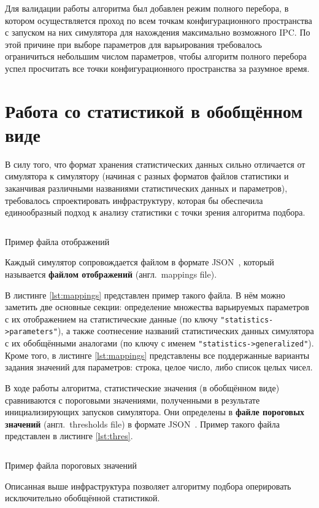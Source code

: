 Для валидации работы алгоритма был добавлен режим полного перебора, в котором осуществляется проход по всем точкам конфигурационного пространства с запуском на них симулятора для нахождения максимально возможного IPC. По этой причине при выборе параметров для варьирования требовалось ограничиться небольшим числом параметров, чтобы алгоритм полного перебора успел просчитать все точки конфигурационного пространства за разумное время.

\section{Работа со статистикой в обобщённом виде}

В силу того, что формат хранения статистических данных сильно отличается от симулятора к симулятору (начиная с разных форматов файлов статистики и заканчивая различными названиями статистических данных и параметров), требовалось спроектировать инфраструктуру, которая бы обеспечила единообразный подход к анализу статистики с точки зрения алгоритма подбора.

\begin{listing}[!htbp]
  \centering
  \inputminted{js}{listings/mappings.json}
  \caption{Пример файла отображений}
  \label{lst:mappings}
\end{listing}

Каждый симулятор сопровождается файлом в формате JSON~\cite{bray2014javascript}, который называется \textbf{файлом отображений} (англ.~mappings file).


В листинге \ref{lst:mappings} представлен пример такого файла. В нём можно заметить две основные секции: определение множества варьируемых параметров с их отображением на статистические данные (по ключу \texttt{"statistics->parameters"}), а также соотнесение названий статистических данных симулятора с их обобщёнными аналогами (по ключу с именем \texttt{"statistics->generalized"}). Кроме того, в листинге \ref{lst:mappings} представлены все поддержанные варианты задания значений для параметров: строка, целое число, либо список целых чисел.

В ходе работы алгоритма, статистические значения (в обобщённом виде) сравниваются с пороговыми значениями, полученными в результате инициализирующих запусков симулятора. Они определены в \textbf{файле пороговых значений} (англ.~thresholds file) в формате JSON~\cite{bray2014javascript}. Пример такого файла представлен в листинге \ref{lst:thres}.

\begin{listing}[!ht]
  \centering
  \inputminted{js}{listings/thres.json}
  \caption{Пример файла пороговых значений}
  \label{lst:thres}
\end{listing}


Описанная выше инфраструктура позволяет алгоритму подбора оперировать исключительно обобщённой статистикой.
